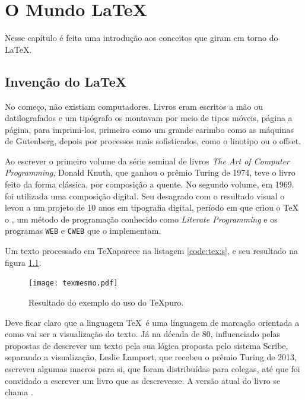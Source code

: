 \chapter{O Mundo \LaTeX}
\label{chap:mundo}

Nesse capítulo é feita uma introdução aos conceitos que giram em torno do \LaTeX.

\section{Invenção do \LaTeX}

No começo, não existiam computadores. Livros eram escritos a mão ou datilografados e um tipógrafo os montavam por meio de tipos móveis, página a página, para imprimi-los, primeiro como um grande carimbo como as máquinas de Gutenberg, depois por processos mais sofisticados, como o linotipo ou o offset.

Ao escrever o primeiro volume da série seminal de livros \textit{The Art of Computer Programming}, Donald Knuth, que ganhou o prêmio Turing de 1974, teve o livro feito da forma clássica, por composição a quente. No segundo volume, em 1969. foi utilizada uma composição digital. Seu desagrado com o resultado visual o levou a um projeto de 10 anos em tipografia digital, período em que criou o \TeX\, o , um método de programação conhecido como \textit{Literate Programming} e os programas \texttt{WEB} e \texttt{CWEB} que o implementam.




Um texto processado em \TeX aparece na listagem \ref{code:tex:s}, e seu resultado na figura \ref{fig:texmesmo}.





\begin{figure}[hbt]
    \centering
    \texttt{[image: texmesmo.pdf]}
    \caption[Resultado do exemplo do uso do \TeX puro.]{Resultado do exemplo do uso do \TeX puro.}
    \label{fig:texmesmo}
\end{figure}

Deve ficar claro que a linguagem \TeX\ é uma linguagem de marcação orientada a como vai ser a visualização do texto. Já na década de 80,  influenciado pelas propostas de descrever um texto pela sua lógica proposta pelo sistema Scribe\parencite{Reid:1980}, separando a visualização, Leslie Lamport, que recebeu o prêmio Turing de 2013, escreveu algumas macros para si, que foram distribuídas para colegas, até que foi convidado a escrever um livro que as descrevesse\parencite{Mittelbach:1999}. A versão atual do livro se chama \parencite{latex:userguide}.

